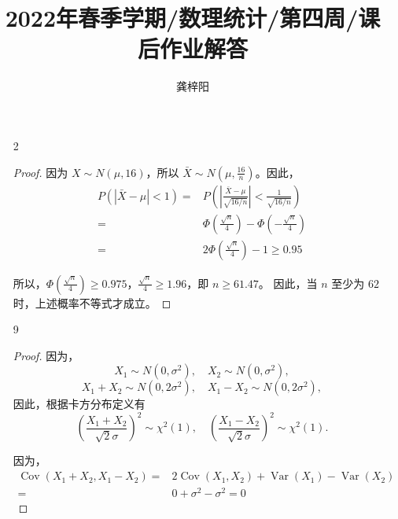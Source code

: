 \documentclass[normal,cn]{elegantnote}
\title{2022年春季学期/数理统计/第四周/课后作业解答}
\author{龚梓阳}
\date{\zhtoday}
\begin{document}
\maketitle
\begin{enumerate}
    \item[2]
        \begin{proof}
            因为 $X\sim N(\mu,16)$，所以 $\bar{X}\sim N\left(\mu,\frac{16}{n}\right)$。因此，
            \begin{equation*}
                \begin{aligned}
                    P(|\bar{X}-\mu|<1)= & P\left(\left|\frac{\bar{X}-\mu}{\sqrt{16/n}}\right|<\frac{1}{\sqrt{16/n}}\right) \\
                    =                   & \Phi\left(\frac{\sqrt{n}}{4}\right)-\Phi\left(-\frac{\sqrt{n}}{4}\right)         \\
                    =                   & 2\Phi\left(\frac{\sqrt{n}}{4}\right)-1\geq0.95
                \end{aligned}
            \end{equation*}

            所以，$\Phi\left(\frac{\sqrt{n}}{4}\right)\geq0.975$，$\frac{\sqrt{n}}{4}\geq1.96$，即 $n\geq61.47$。
            因此，当 $n$ 至少为 $62$ 时，上述概率不等式才成立。
        \end{proof}
    \item[9]
        \begin{proof}
            因为，
            \begin{equation*}
                X_{1}\sim N(0,\sigma^2),\quad X_{2}\sim N(0,\sigma^2),
            \end{equation*}
            \begin{equation*}
                X_{1}+X_{2}\sim N(0,2\sigma^2),\quad X_{1}-X_{2}\sim N(0,2\sigma^2),
            \end{equation*}
            因此，根据卡方分布定义有
            \begin{equation*}
                \left(\frac{X_{1}+X_{2}}{\sqrt{2}\sigma}\right)^2\sim\chi^{2}(1),\quad\left(\frac{X_{1}-X_{2}}{\sqrt{2}\sigma}\right)^2\sim\chi^{2}(1).
            \end{equation*}

            因为，
            \begin{equation*}
                \begin{aligned}
                    \operatorname{Cov}(X_{1}+X_{2},X_{1}-X_{2})= & 2\operatorname{Cov}(X_{1},X_{2})+\operatorname{Var}(X_{1})-\operatorname{Var}(X_{2}) \\
                    =                                            & 0+\sigma^2-\sigma^2=0
                \end{aligned}
            \end{equation*}


\end{proof}
\end{enumerate}
\end{document}
